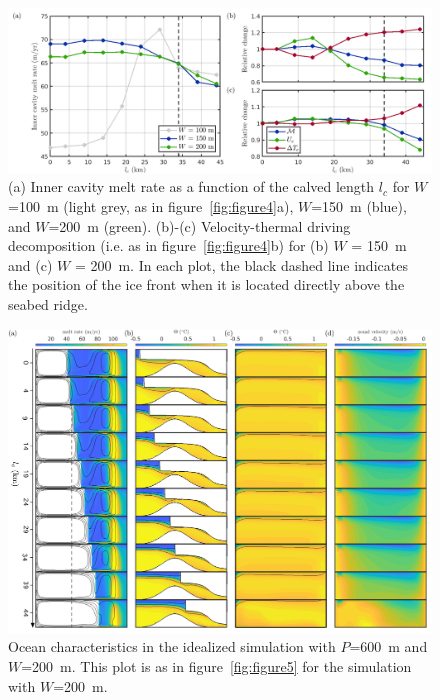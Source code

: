 \documentclass[draft]{agujournal2019}
\begin{document}
\begin{figure}
    \centering
    \includegraphics[width = \textwidth]{../make_figures/plots/figure6.png}
    \caption{(a) Inner cavity melt rate as a function of the calved length $l_c$ for $W$=100~m (light grey, as in figure~\ref{fig:figure4}a), $W$=150~m (blue), and $W$=200~m (green).  (b)-(c) Velocity-thermal driving decomposition (i.e. as in figure~\ref{fig:figure4}b) for (b) $W$ = 150~m and (c) $W$ = 200~m. In each plot, the black dashed line indicates the position of the ice front when it is located directly above the seabed ridge.}
    \label{fig:figure6}
\end{figure}

\begin{figure}
    \centering
    \includegraphics[width = \textwidth]{../make_figures/plots/figure7_axislabel.pdf}
    \caption{Ocean characteristics in the idealized simulation with $P$=600~m and $W$=200~m. This plot is as in figure~\ref{fig:figure5} for the simulation with $W$=200~m.}
    \label{fig:figure7}
\end{figure}
\end{document}
